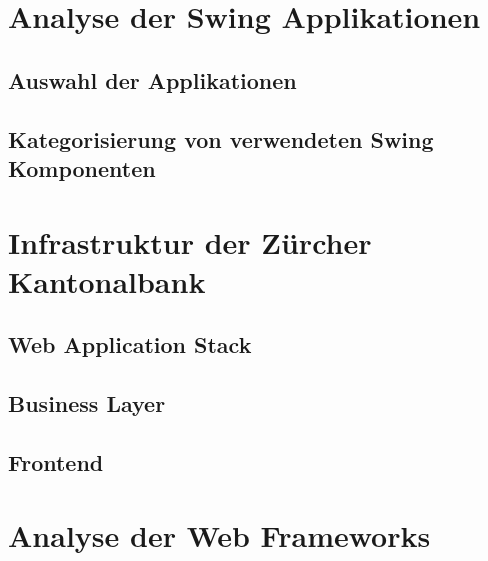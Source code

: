 \documentclass[
11pt, %
a4paper, %
BCOR25mm, %
DIV14, %
footsepline = false, %
headsepline, %
twoside, %
openright,
abstracton, %
listof=totocnumbered, %
bibliography=totocnumbered %
]{scrreprt}
\begin{document}
  \cleardoublepage
   
   
  \chapter{Analyse der Swing Applikationen}
  
  \section{Auswahl der Applikationen}
  
  \section{Kategorisierung von verwendeten Swing Komponenten}

  \cleardoublepage
   
   
  \chapter{Infrastruktur der Zürcher Kantonalbank}
  
  \section{Web Application Stack}
  
  \section{Business Layer}
  
  \section{Frontend}

  \cleardoublepage
  
   
  \chapter{Analyse der Web Frameworks}
  
\end{document}

